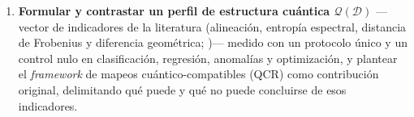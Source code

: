 \begin{enumerate}
    \item \textbf{Formular y contrastar un perfil de estructura cuántica $\mathcal{Q}(\mathcal{D})$} ---vector de indicadores de la literatura (alineación, entropía espectral, distancia de Frobenius y diferencia geométrica; \citealp{huang2021, liu2021, thanasilp2022})--- medido con un protocolo único y un control nulo en clasificación, regresión, anomalías y optimización, y plantear el \emph{framework} de mapeos cuántico-compatibles (QCR) como contribución original, delimitando qué puede y qué no puede concluirse de esos indicadores.
\end{enumerate}
